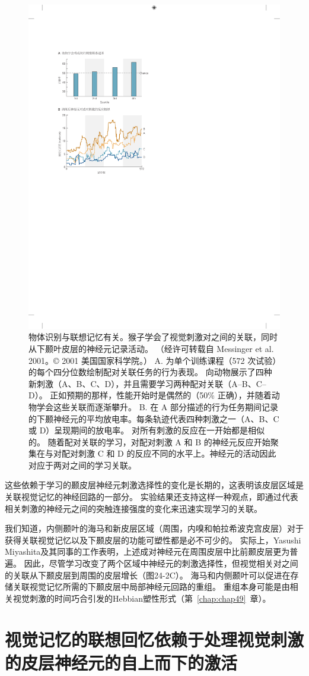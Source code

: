 \begin{figure}[htbp]
	\centering
	\includegraphics[width=0.5\linewidth]{chap24/fig_24_12}
	\caption{物体识别与联想记忆有关。猴子学会了视觉刺激对之间的关联，同时从下颞叶皮层的神经元记录活动。 （经许可转载自 Messinger et al. 2001。© 2001 美国国家科学院。） A. 为单个训练课程（572 次试验）的每个四分位数绘制配对关联任务的行为表现。 向动物展示了四种新刺激（A、B、C、D），并且需要学习两种配对关联（A–B、C–D）。 正如预期的那样，性能开始时是偶然的（50\% 正确），并随着动物学会这些关联而逐渐攀升。 B. 在 A 部分描述的行为任务期间记录的下颞神经元的平均放电率。每条轨迹代表四种刺激之一（A、B、C 或 D）呈现期间的放电率。 对所有刺激的反应在一开始都是相似的。 随着配对关联的学习，对配对刺激 A 和 B 的神经元反应开始聚集在与对配对刺激 C 和 D 的反应不同的水平上。神经元的活动因此对应于两对之间的学习关联。}
	\label{fig:24_12}
\end{figure}


这些依赖于学习的颞皮层神经元刺激选择性的变化是长期的，这表明该皮层区域是关联视觉记忆的神经回路的一部分。
实验结果还支持这样一种观点，即通过代表相关刺激的神经元之间的突触连接强度的变化来迅速实现学习的关联。


我们知道，内侧颞叶的海马和新皮层区域（周围，内嗅和帕拉希波克宫皮层）对于获得关联视觉记忆以及下颞皮层的功能可塑性都是必不可少的。
实际上，Yasushi Miyashita及其同事的工作表明，上述成对神经元在周围皮层中比前颞皮层更为普遍。
因此，尽管学习改变了两个区域中神经元的刺激选择性，但视觉相关对之间的关联从下颞皮层到周围的皮层增长（图24-2C）。
海马和内侧颞叶可以促进在存储关联视觉记忆所需的下颞皮层中局部神经元回路的重组。
重组本身可能是由相关视觉刺激的时间巧合引发的Hebbian塑性形式（第~\ref{chap:chap49}~章）。



\section{视觉记忆的联想回忆依赖于处理视觉刺激的皮层神经元的自上而下的激活}

